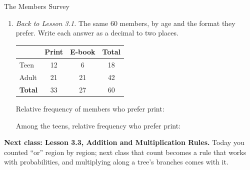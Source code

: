 \documentclass[12pt]{article}
\begin{document}
\begin{notesbox}{The Members Survey}
\begin{enumerate}[leftmargin=1.6em, itemsep=5pt, topsep=2pt, start=3]
  \item \emph{Back to Lesson 3.1.} The same $60$ members, by age and the format they prefer.
        Write each answer as a decimal to two places.

        \begin{center}
        \renewcommand{\arraystretch}{1.15}
        \begin{tabular}{@{} l c c c @{}}
        \toprule
        & \textbf{Print} & \textbf{E-book} & \textbf{Total} \\
        \midrule
        Teen & 12 & 6 & 18 \\
        Adult & 21 & 21 & 42 \\
        \textbf{Total} & 33 & 27 & 60 \\
        \bottomrule
        \end{tabular}
        \end{center}
        \vspace{-3pt}
        Relative frequency of members who prefer print: \hfill \blank{1.8cm}
        \par\vspace{2pt}
        Among the teens, relative frequency who prefer print: \hfill \blank{1.8cm}

\end{enumerate}
\end{notesbox}

\boxguard[5]
\begin{spiralbox}
\textbf{Next class: Lesson 3.3, Addition and Multiplication Rules.} Today you counted ``or''
region by region; next class that count becomes a rule that works with probabilities, and
multiplying along a tree's branches comes with it.
\end{spiralbox}
\end{document}
